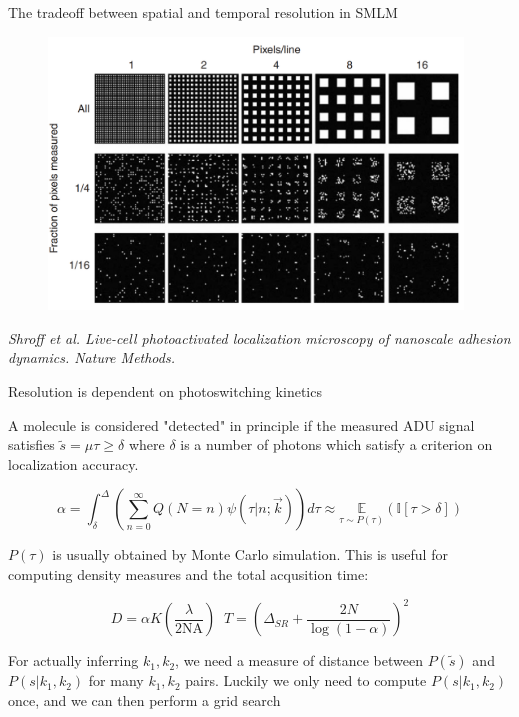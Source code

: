 \documentclass{beamer}					%
\begin{document}
\begin{frame}{The tradeoff between spatial and temporal resolution in SMLM}
\begin{figure}
\includegraphics[width=11cm]{Shroff.png}
\end{figure}
\textit{Shroff et al. Live-cell photoactivated localization microscopy of
nanoscale adhesion dynamics. Nature Methods.}
\end{frame}


\begin{frame}{Resolution is dependent on photoswitching kinetics}

A molecule is considered "detected" in principle if the measured ADU signal satisfies $\tilde{s} =\mu\tau \geq \delta$ where $\delta$ is a number of photons which satisfy a criterion on localization accuracy.

\begin{equation*}
\alpha = \int_{\delta}^{\Delta}\left(\sum_{n=0}^{\infty}Q(N=n)\psi(\tau|n;\vec{k})\right)d\tau \approx \underset{\tau\sim P(\tau)}{\mathbb{E}}\left(\mathbb{I}[\tau > \delta]\right)
\end{equation*}

$P(\tau)$ is usually obtained by Monte Carlo simulation. This is useful for computing density measures and the total acqusition time:

\begin{equation*}
D = \alpha K\left(\frac{\lambda}{2\mathrm{NA}}\right)\;\; T = \left(\Delta_{SR}+\frac{2N}{\log(1-\alpha)}\right)^{2}
\end{equation*}

For actually inferring $k_{1},k_{2}$, we need a measure of distance between $P(\tilde{s})$ and $P(s|k_{1},k_{2})$ for many $k_{1},k_{2}$ pairs. Luckily we only need to compute $P(s|k_{1},k_{2})$ once, and we can then perform a grid search

\end{frame}
\end{document}
